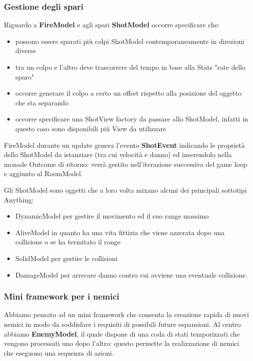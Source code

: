 \subsubsection{Gestione degli spari}
Riguardo a \textbf{FireModel} e agli spari \textbf{ShotModel} occorre specificare che:
\begin{itemize}
    \item possono essere sparati più colpi ShotModel contemporaneamente in direzioni diverse
    \item tra un colpo e l'altro deve trascorrere del tempo in base alla Stats "rate dello sparo"
    \item occorre generare il colpo a certo un offset rispetto alla posizione del oggetto che sta separando
    \item occorre specificare una ShotView factory da passare allo ShotModel, infatti in questo caso sono disponibili più View da utilizzare
\end{itemize}

FireModel durante un update genera l'evento \textbf{ShotEvent} indicando le proprietà dello ShotModel da istanziare (tra cui velocità e danno) ed inserendolo nella monade Outcome di ritorno: verrà gestito nell'iterazione successiva del game loop e aggiunto al RoomModel.

Gli ShotModel sono oggetti che a loro volta mixano alcuni dei principali sottotipi Anything: 
\begin{itemize}
	\item DynamicModel per gestire il movimento ed il suo range massimo
	\item AliveModel in quanto ha una vita fittizia che viene azzerata dopo una collisione o se ha termitato il range 
	\item SolidModel per gestire le collisioni
	\item DamageModel per arrecare danno contro cui avviene una eventuale collisione.
\end{itemize}

\subsubsection{Mini framework per i nemici}

Abbiamo pensato ad un mini framework che consenta la creazione rapida di nuovi nemici in modo da soddisfare i requisiti di possibili future espansioni.
Al centro abbiamo \textbf{EnemyModel}, il quale dispone di una coda di stati temporizzati che vengono processati uno dopo l'altro: questo permette la realizzazione di nemici che eseguono una sequenza di azioni.

